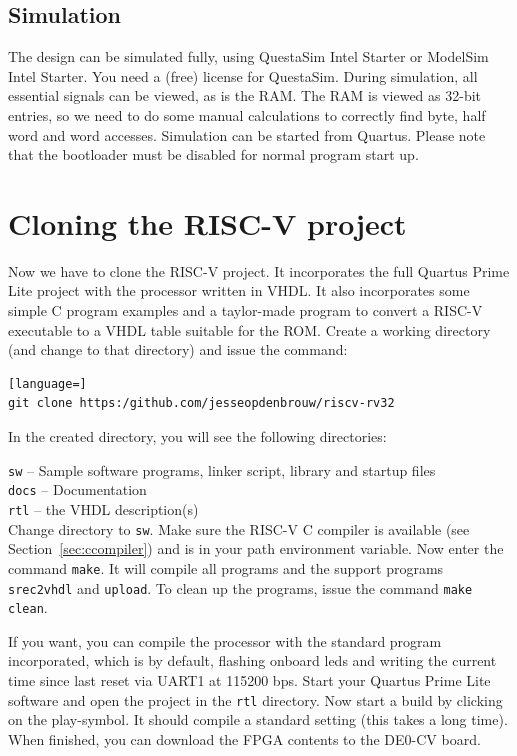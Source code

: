 \documentclass[12pt]{article}
\begin{document}
\subsection{Simulation}
The design can be simulated fully, using QuestaSim Intel Starter or ModelSim Intel Starter. You need a (free) license for QuestaSim. During simulation, all essential signals can be viewed, as is the RAM. The RAM is viewed as 32-bit entries, so we need to do some manual calculations to correctly find byte, half word and word accesses. Simulation can be started from Quartus. Please note that the bootloader must be disabled for normal program start up. 

\section{Cloning the RISC-V project}
\label{sec:cloning}
Now we have to clone the RISC-V project. It incorporates the full Quartus Prime Lite project with the processor written in VHDL. It also incorporates some simple C program examples and a taylor-made program to convert a RISC-V executable to a VHDL table suitable for the ROM. Create a working directory (and change to that directory) and issue the command:

\begin{lstlisting}[language=]
git clone https:/github.com/jesseopdenbrouw/riscv-rv32
\end{lstlisting}

In the created directory, you will see the following directories:

\lstinline|sw| -- Sample software programs, linker script, library and startup files \\
\lstinline|docs| -- Documentation \\
\lstinline|rtl| -- the VHDL description(s) \\

Change directory to \lstinline|sw|. Make sure the RISC-V C compiler is available (see Section~\ref{sec:ccompiler}) and is in your path environment variable. Now enter the command \lstinline|make|. It will compile all programs and the support programs \lstinline|srec2vhdl| and \lstinline|upload|. To clean up the programs, issue the command \lstinline|make clean|.

If you want, you can compile the processor with the standard program incorporated, which is by default, flashing onboard leds and writing the current time since last reset via UART1 at 115200 bps. Start your Quartus Prime Lite software and open the project in the \lstinline|rtl| directory. Now start a build by clicking on the play-symbol. It should compile a standard setting (this takes a long time). When finished, you can download the FPGA contents to the DE0-CV board.
\end{document}
